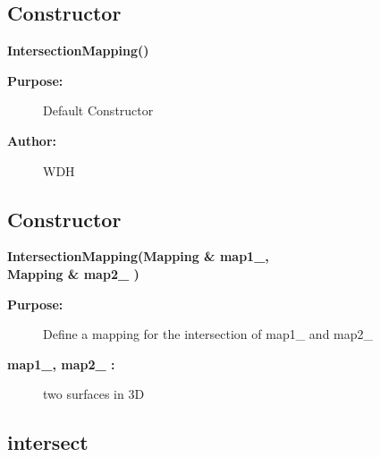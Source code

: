 \subsection{Constructor}
 
\newlength{\IntersectionMappingIncludeArgIndent}
\begin{flushleft} \textbf{%
\settowidth{\IntersectionMappingIncludeArgIndent}{IntersectionMapping(}%
IntersectionMapping() 
}\end{flushleft}
\begin{description}
\item[{\bf Purpose:}]  Default Constructor
\item[{\bf Author:}]  WDH
\end{description}
\subsection{Constructor}
 
\begin{flushleft} \textbf{%
\settowidth{\IntersectionMappingIncludeArgIndent}{IntersectionMapping(}%
IntersectionMapping(Mapping \& map1\_,\\ 
\hspace{\IntersectionMappingIncludeArgIndent}Mapping \& map2\_ )
}\end{flushleft}
\begin{description}
\item[{\bf Purpose:}] 
   Define a mapping for the intersection of map1\_ and map2\_
\item[{\bf map1\_, map2\_ :}]  two surfaces in 3D
\end{description}
\subsection{intersect}
 
